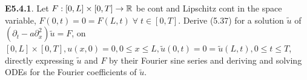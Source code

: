 {\bf E5.4.1}. Let $F: [0,L] \times [0,T] \rightarrow \mathbb{R}$ be cont and Lipschitz cont in the space variable, $F(0,t) = 0 = F(L, t)\; \forall \; t \in [0,T]$. Derive (5.37) for a solution $\tilde{u}$ of $(\partial_t - a \partial_x^2)\tilde{u} = F$, on $[0,L] \times [0,T], u(x,0)=0, 0 \leq x \leq L, \tilde{u}(0,t) = 0 = \tilde{u}(L,t), 0 \leq t \leq T$, directly expressing $\tilde{u}$ and $F$ by their Fourier sine series and deriving and solving ODEs for the Fourier coefficients of $\tilde{u}$.
